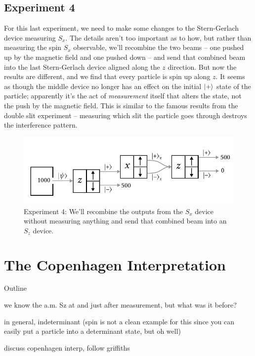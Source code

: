 \subsection{Experiment 4}

For this last experiment, we need to make some changes to the Stern-Gerlach device measuring $S_x$.  The details aren't too important as to how, but rather than measuring the spin $S_x$ observable, we'll recombine the two beams -- one pushed up by the magnetic field and one pushed down -- and send that combined beam into the last Stern-Gerlach device aligned along the $z$ direction.  But now the results are different, and we find that every particle is spin up along $z$.  It seems as though the middle device no longer has an effect on the initial $| + \rangle$ state of the particle; apparently it's the act of \emph{measurement} itself that alters the state, not the push by the magnetic field.  This is similar to the famous results from the double slit experiment -- measuring which slit the particle goes through destroys the interference pattern.

\begin{figure}
\centering\includegraphics[width=\linewidth]{Figures/Chapter 1/fig_sg_4.pdf}
\caption{Experiment 4: We'll recombine the outputs from the $S_x$ device without measuring anything and send that combined beam into an $S_z$ device. }
\label{fig_sg_4}
\end{figure}


%
%
%

\section{The Copenhagen Interpretation}

Outline

we know the a.m. Sz at and just after measurement, but what was it before?  

in general, indeterminant (spin is not a clean example for this since you can easily put a particle into a determinant state, but oh well)

discuss copenhagen interp, follow griffiths


